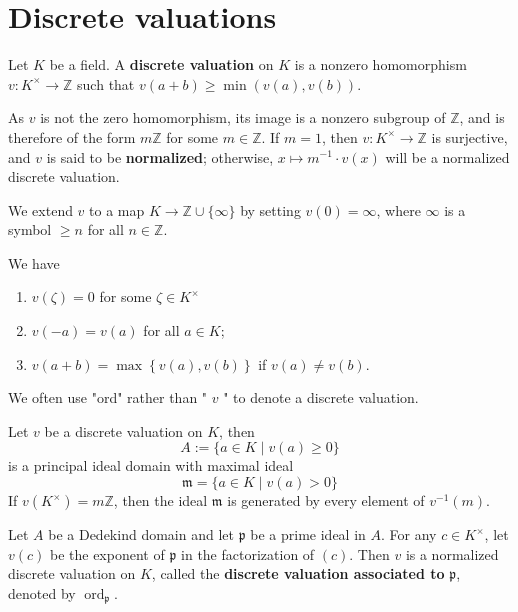 \section{Discrete valuations}
\begin{definition}
    Let $K$ be a field.
    A \textbf{discrete valuation} on $K$ is a nonzero homomorphism $v: K^{\times} \rightarrow \mathbb{Z}$ such that $v(a+b) \geq \min (v(a), v(b))$.

    As $v$ is not the zero homomorphism, its image is a nonzero subgroup of $\mathbb{Z}$, and is therefore of the form $m \mathbb{Z}$ for some $m \in \mathbb{Z}$. If $m=1$, then $v: K^{\times} \rightarrow \mathbb{Z}$ is surjective, and $v$ is said to be \textbf{normalized}; otherwise, $x \mapsto m^{-1} \cdot v(x)$ will be a normalized discrete valuation.

    We extend $v$ to a map $K \rightarrow \mathbb{Z} \cup\{\infty\}$ by setting $v(0)=\infty$, where $\infty$ is a symbol $\geq n$ for all $n \in \mathbb{Z}$.
    \begin{remark}
        We have
        \begin{enumerate}
            \item $v(\zeta)=0$ for some $\zeta \in K^{\times}$
            \item $v(-a)=v(a)$ for all $a \in K$;
            \item $v(a+b) = \max \left\{v(a),v(b)\right\}$ if $v(a) \neq v(b)$.
        \end{enumerate}
        We often use "ord" rather than " $v$ " to denote a discrete valuation.
    \end{remark}
\end{definition}

\begin{proposition}
    Let $v$ be a discrete valuation on $K$, then
    \begin{equation*}
        A
        :=
        \{a \in K \mid v(a) \geq 0\}
    \end{equation*}
    is a principal ideal domain with maximal ideal
    \begin{equation*}
        \mathfrak{m}
        =
        \{a \in K \mid v(a)>0\}
    \end{equation*}
    If $v\left(K^{\times}\right)=m \mathbb{Z}$, then the ideal $\mathfrak{m}$ is generated by every element of $v^{-1}\left(m\right)$.
\end{proposition}


\begin{definition}
    Let $A$ be a Dedekind domain and let $\mathfrak{p}$ be a prime ideal in $A$. For any $c \in K^{\times}$, let $v(c)$ be the exponent of $\mathfrak{p}$ in the factorization of
    $(c)$.
    Then $v$ is a normalized discrete valuation on $K$, called the \textbf{discrete valuation associated to} $\mathfrak{p}$, denoted by $\operatorname{ord}_{\mathfrak{p}}$.
\end{definition}

